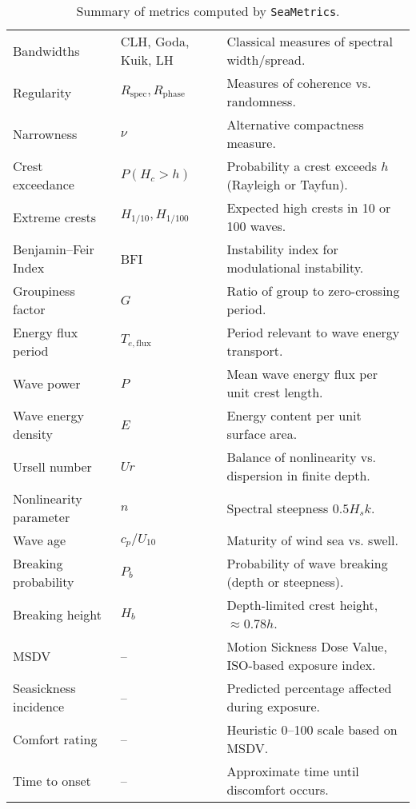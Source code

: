 \documentclass[11pt]{article}
\begin{document}
\begin{table}[H]
\begin{tabular}{|l|l|p{8cm}|}
\hline
Bandwidths & CLH, Goda, Kuik, LH & Classical measures of spectral width/spread. \\
Regularity & $R_{\text{spec}}, R_{\text{phase}}$ & Measures of coherence vs. randomness. \\
Narrowness & $\nu$ & Alternative compactness measure. \\
\hline
Crest exceedance & $P(H_c>h)$ & Probability a crest exceeds $h$ (Rayleigh or Tayfun). \\
Extreme crests & $H_{1/10}, H_{1/100}$ & Expected high crests in 10 or 100 waves. \\
Benjamin–Feir Index & BFI & Instability index for modulational instability. \\
Groupiness factor & $G$ & Ratio of group to zero-crossing period. \\
\hline
Energy flux period & $T_{e,\text{flux}}$ & Period relevant to wave energy transport. \\
Wave power & $P$ & Mean wave energy flux per unit crest length. \\
Wave energy density & $E$ & Energy content per unit surface area. \\
\hline
Ursell number & $Ur$ & Balance of nonlinearity vs. dispersion in finite depth. \\
Nonlinearity parameter & $n$ & Spectral steepness $0.5H_sk$. \\
Wave age & $c_p/U_{10}$ & Maturity of wind sea vs. swell. \\
\hline
Breaking probability & $P_b$ & Probability of wave breaking (depth or steepness). \\
Breaking height & $H_b$ & Depth-limited crest height, $\approx 0.78 h$. \\
\hline
MSDV & -- & Motion Sickness Dose Value, ISO-based exposure index. \\
Seasickness incidence & -- & Predicted percentage affected during exposure. \\
Comfort rating & -- & Heuristic 0--100 scale based on MSDV. \\
Time to onset & -- & Approximate time until discomfort occurs. \\
\hline
\end{tabular}
\caption{Summary of metrics computed by \texttt{SeaMetrics}.}
\label{tab:metrics}
\end{table}
\end{document}
